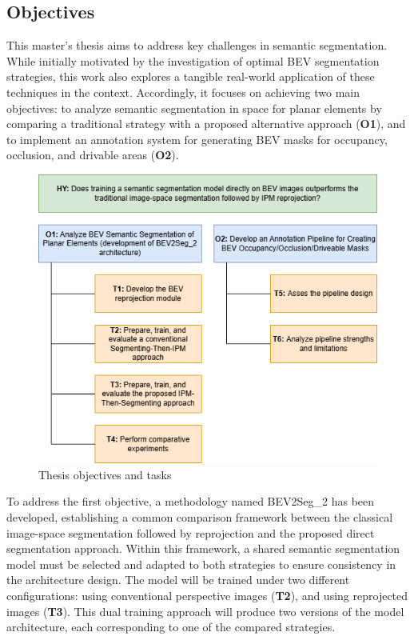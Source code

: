 \subsection{Objectives}
This master's thesis aims to address key challenges in  semantic segmentation. While initially motivated by the investigation of optimal BEV segmentation strategies, this work also explores a tangible real-world application of these techniques in the  context. Accordingly, it focuses on achieving two main objectives: to analyze semantic segmentation in  space for planar elements by comparing a traditional strategy with a proposed alternative approach (\textbf{O1}), and to implement an annotation system for generating BEV masks for occupancy, occlusion, and drivable areas (\textbf{O2}).

\begin{figure}[h!]
    \centering
    \includegraphics[width=0.8\linewidth]{./images/introduction/TFM_Objectives.png}
    \caption{Thesis objectives and tasks}
    \label{fig:objectives}
\end{figure}

To address the first objective, a methodology named BEV2Seg\_2 has been developed, establishing a common comparison framework between the classical image-space segmentation followed by  reprojection and the proposed direct  segmentation approach. Within this framework, a shared semantic segmentation model must be selected and adapted to both strategies to ensure consistency in the architecture design. The model will be trained under two different configurations: using conventional perspective images (\textbf{T2}), and using  reprojected images (\textbf{T3}). This dual training approach will produce two versions of the model architecture, each corresponding to one of the compared strategies.


